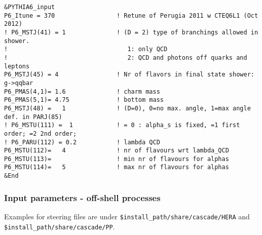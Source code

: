 \documentclass[11pt]{article} \usepackage{mystyle-new}
\newenvironment{tolerant}[1]{\par\tolerance=#1\relax}{ \par }
\begin{document}
\begin{tolerant}{3000}
\begin{footnotesize}
\begin{verbatim}
&PYTHIA6_input
P6_Itune = 370                 ! Retune of Perugia 2011 w CTEQ6L1 (Oct 2012)
! P6_MSTJ(41) = 1              ! (D = 2) type of branchings allowed in shower.
!                                 1: only QCD
!                                 2: QCD and photons off quarks and leptons
P6_MSTJ(45) = 4                ! Nr of flavors in final state shower: g->qqbar
P6_PMAS(4,1)= 1.6              ! charm mass
P6_PMAS(5,1)= 4.75             ! bottom mass
P6_MSTJ(48) =   1              ! (D=0), 0=no max. angle, 1=max angle def. in PARJ(85)
! P6_MSTU(111) =  1            ! = 0 : alpha_s is fixed, =1 first order; =2 2nd order;
! P6_PARU(112) = 0.2           ! lambda QCD
P6_MSTU(112)=   4              ! nr of flavours wrt lambda_QCD
P6_MSTU(113)=                  ! min nr of flavours for alphas
P6_MSTU(114)=   5              ! max nr of flavours for alphas
&End
\end{verbatim}
\end{footnotesize}
\end{tolerant}

\subsubsection{Input parameters - off-shell processes}
\label{sec:OldSteer}
\begin{tolerant}{3000}
Examples for steering files are under \verb+$install_path/share/cascade/HERA+ and \verb+$install_path/share/cascade/PP+.
\end{tolerant}
\end{document}
